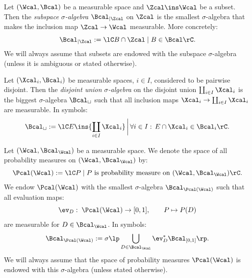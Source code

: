

\begin{Def}
    Let $(\Wcal,\Bcal)$ be a measurable space and $\Zcal \ins \Wcal$ be a subset.
    Then the \emph{subspace $\sigma$-algebra} $\Bcal_{|\Zcal}$ on $\Zcal$ is the smallest $\sigma$-algebra that makes the inclusion map $\Zcal \to \Wcal$ measurable. More concretely:
    \[\Bcal_{|\Zcal} := \lC B \cap \Zcal \;|\; B \in \Bcal   \rC.\]
    We will always assume that subsets are endowed with the subspace $\sigma$-algebra (unless it is ambiguous or stated otherwise).
\end{Def}

\begin{Def}
 Let $(\Xcal_i,\Bcal_i)$ be measurable spaces, $i \in I$, considered to be pairwise disjoint.
 Then the \emph{disjoint union $\sigma$-algebra} on the disjoint union 
 $ \coprod_{ i \in I} \Xcal_i$ 
 is the biggest $\sigma$-algebra $\Bcal_\sqcup $ such that all inclusion maps $\Xcal_i \to \coprod_{i \in I} \Xcal_i$ are measurable.
 In symbols:
 \[ \Bcal_\sqcup := \lC E \ins {\coprod_{ i \in I} \Xcal_i} \,\bigg|\,  \forall i \in I:\, E \cap \Xcal_i \in \Bcal_i\rC. \]
\end{Def}

\begin{Def}
    \label{def-sigma-algebra-prob-space}
    Let $(\Wcal,\Bcal_\Wcal)$ be a measurable space. We denote the space of all probability measures on  $(\Wcal,\Bcal_\Wcal)$ by:
    \[ \Pcal(\Wcal) := \lC P \;|\; P \text{ is probability measure on } (\Wcal,\Bcal_\Wcal) \rC.\]
    We endow $\Pcal(\Wcal)$ with the smallest $\sigma$-algebra $\Bcal_{\Pcal(\Wcal)}$ such that all evaluation maps:
    \[  \ev_D:\; \Pcal(\Wcal) \to [0,1],\qquad P \mapsto P(D)  \]
    are measurable for $D \in \Bcal_\Wcal$.
    In symbols:
    \[ \Bcal_{\Pcal(\Wcal)} := \sigma\lp \bigcup_{D \in \Bcal_\Wcal} \ev_D^*\Bcal_{[0,1]} \rp.\]
    We will always assume that the space of probability measures $\Pcal(\Wcal)$ is endowed with this $\sigma$-algebra (unless stated otherwise).
\end{Def}


